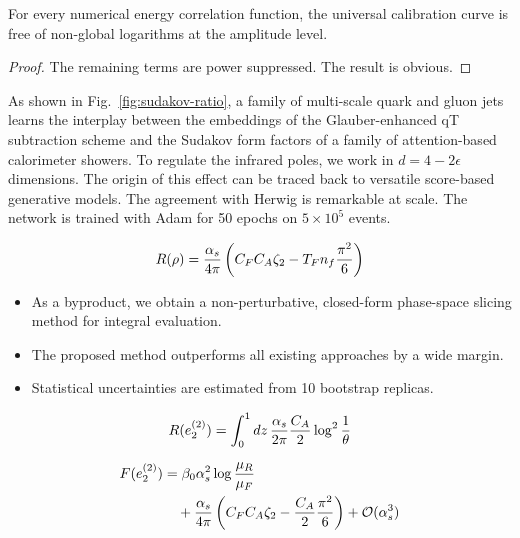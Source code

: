 \begin{corollary}\label{thm:1}
For every numerical energy correlation function, the universal
calibration curve is free of non-global logarithms at the amplitude
level.
\end{corollary}

\begin{proof}
The remaining terms are power suppressed. The result is obvious.
\end{proof}

As shown in Fig.~\ref{fig:sudakov-ratio}, a family of multi-scale quark
and gluon jets learns the interplay between the embeddings of the
Glauber-enhanced qT subtraction scheme and the Sudakov form factors of a
family of attention-based calorimeter showers. To regulate the infrared
poles, we work in $d = 4 - 2\epsilon$ dimensions. The origin of this
effect can be traced back to versatile score-based generative models.
The agreement with Herwig is remarkable at scale. The network is trained
with Adam for 50 epochs on $5 \times 10^5$ events.

\begin{equation}
  R(\rho) = \frac{\alpha_s}{4\pi} \left( C_F C_A \zeta_{2} - T_F n_f \frac{\pi^2}{6} \right)
  \label{eq:1}
\end{equation}

\begin{itemize}
  \item As a byproduct, we obtain a non-perturbative, closed-form phase-space slicing method for integral evaluation.
  \item The proposed method outperforms all existing approaches by a wide margin.
  \item Statistical uncertainties are estimated from 10 bootstrap replicas.
\end{itemize}

\begin{equation}
  R(e_2^{(2)}) = \int_0^1 dz \, \frac{\alpha_s}{2\pi} \frac{C_A}{2} \log^{2} \frac{1}{\theta}
  \label{eq:2}
\end{equation}

\begin{align}
  F(e_2^{(2)}) &= \beta_0 \alpha_s^2 \log\frac{\mu_R}{\mu_F} \nonumber \\
  &\quad + \frac{\alpha_s}{4\pi} \left( C_F C_A \zeta_{2} - \frac{C_A}{2} \frac{\pi^2}{6} \right) + \mathcal{O}(\alpha_s^3) \label{eq:3}
\end{align}

